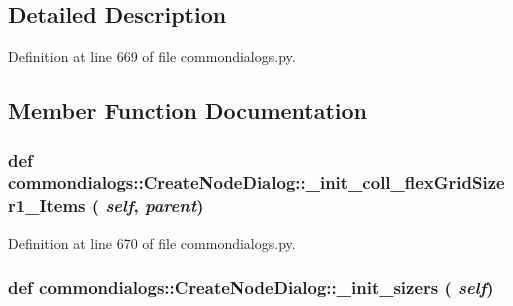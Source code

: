 \subsection{Detailed Description}




Definition at line 669 of file commondialogs.py.

\subsection{Member Function Documentation}
\hypertarget{classcommondialogs_1_1CreateNodeDialog_39d47edefb6b24dc8ad6ffa12d3d1bef}{
\subsubsection[\_\-init\_\-coll\_\-flexGridSizer1\_\-Items]{\setlength{\rightskip}{0pt plus 5cm}def commondialogs::Create\-Node\-Dialog::\_\-init\_\-coll\_\-flex\-Grid\-Sizer1\_\-Items ( {\em self},  {\em parent})}}
\label{classcommondialogs_1_1CreateNodeDialog_39d47edefb6b24dc8ad6ffa12d3d1bef}




Definition at line 670 of file commondialogs.py.\hypertarget{classcommondialogs_1_1CreateNodeDialog_f071ab5e59b63ec2712cd90dc90ac61a}{
\subsubsection[\_\-init\_\-sizers]{\setlength{\rightskip}{0pt plus 5cm}def commondialogs::Create\-Node\-Dialog::\_\-init\_\-sizers ( {\em self})}}
\label{classcommondialogs_1_1CreateNodeDialog_f071ab5e59b63ec2712cd90dc90ac61a}




